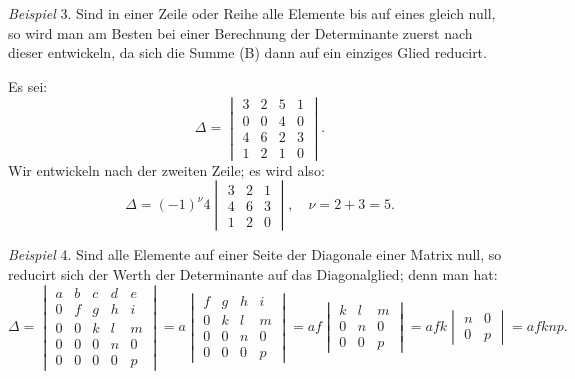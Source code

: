 \documentclass[11pt]{article}
\providecommand{\weberpage}[1]{}
\let\Delta\varDelta
\begin{document}
\weberpage{36}

\textit{Beispiel} 3. Sind in einer Zeile oder Reihe alle Elemente bis auf
eines gleich null, so wird man am Besten bei einer Berechnung der
Determinante zuerst nach dieser entwickeln, da sich die Summe (B) dann auf
ein einziges Glied reducirt.

Es sei:
\[
\Delta=\begin{vmatrix} 3 & 2 & 5 & 1 \\ 0 & 0 & 4 & 0 \\ 4 & 6 & 2 & 3 \\ 1 & 2 & 1 & 0 \end{vmatrix}.
\]
Wir entwickeln nach der zweiten Zeile; es wird also:
\[
\Delta=(-1)^\nu 4\begin{vmatrix} 3 & 2 & 1 \\ 4 & 6 & 3 \\ 1 & 2 & 0 \end{vmatrix}, \quad \nu=2+3=5.
\]

\textit{Beispiel} 4. Sind alle Elemente auf einer Seite der Diagonale einer
Matrix null, so reducirt sich der Werth der Determinante auf das
Diagonalglied; denn man hat:
\[
\Delta=\begin{vmatrix}
a & b & c & d & e \\
0 & f & g & h & i \\
0 & 0 & k & l & m \\
0 & 0 & 0 & n & 0 \\
0 & 0 & 0 & 0 & p
\end{vmatrix}
=a\begin{vmatrix} f & g & h & i \\ 0 & k & l & m \\ 0 & 0 & n & 0 \\ 0 & 0 & 0 & p \end{vmatrix}
=af\begin{vmatrix} k & l & m \\ 0 & n & 0 \\ 0 & 0 & p \end{vmatrix}
=afk\begin{vmatrix} n & 0 \\ 0 & p \end{vmatrix}
=afknp.
\]
\end{document}
